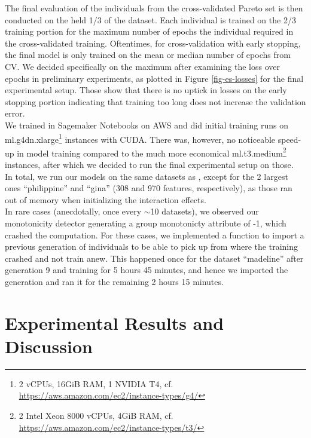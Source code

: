 \documentclass[twoside,11pt]{article}
\begin{document}
The final evaluation of the individuals from the cross-validated Pareto set is then conducted on the held 1/3 of the dataset. Each individual
is trained on the 2/3 training portion for the maximum number of epochs the individual required in the cross-validated training.
Oftentimes, for cross-validation with early stopping, the final model is only trained on the mean or median number of epochs from CV.
We decided specifically on the maximum after examining the loss over epochs in preliminary experiments, as plotted in Figure \ref{fig-es-losses}
for the final experimental setup. Those show that there is no uptick in losses on the early stopping portion indicating that training too long does not increase
the validation error.
\\
We trained in Sagemaker Notebooks on AWS and did initial training runs on
ml.g4dn.xlarge\footnote{2 vCPUs, 16GiB RAM, 1 NVIDIA T4, cf. \url{https://aws.amazon.com/ec2/instance-types/g4/}} instances with CUDA.
There was, however, no noticeable speed-up in model training compared to the much more economical
ml.t3.medium\footnote{2 Intel Xeon 8000 vCPUs, 4GiB RAM, cf. \url{https://aws.amazon.com/ec2/instance-types/t3/}} instances, after which we decided to run the
final experimental setup on those.
\\
In total, we run our models on the same datasets as \citet[p. 544]{EAGGA}, except for the 2 largest ones ``philippine'' and ``gina'' (308 and 970 features, respectively),
as those ran out of memory when initializing the interaction effects.
\\
In rare cases (anecdotally, once every $\sim$10 datasets), we observed our monotonicity detector generating a group monotonicty attribute of -1, which crashed the computation.
For these cases, we implemented a function to import a previous generation of individuals to be able to pick up from where the training crashed and not train anew.
This happened once for the dataset ``madeline'' after generation 9 and training for 5 hours 45 minutes, and hence we imported the generation and ran it for the remaining
2 hours 15 minutes.


\section{Experimental Results and Discussion}
\end{document}
